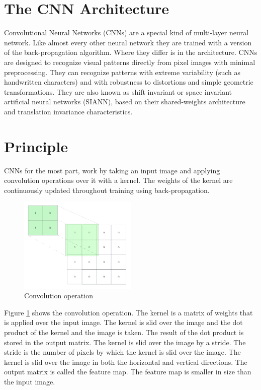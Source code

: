 \documentclass[wide]{adonis}
\begin{document}


\maketitle

\section{The CNN Architecture}

Convolutional Neural Networks (CNNs) are a special kind of multi-layer neural network. Like almost every other neural network they are trained with a version of the back-propagation algorithm. Where they differ is in the architecture. CNNs are designed to recognize visual patterns directly from pixel images with minimal preprocessing. They can recognize patterns with extreme variability (such as handwritten characters) and with robustness to distortions and simple geometric transformations. They are also known as shift invariant or space invariant artificial neural networks (SIANN), based on their shared-weights architecture and translation invariance characteristics.

\section{Principle}

CNNs for the most part, work by taking an input image and applying convolution operations over it with a kernel. The weights of the kernel are continuously updated throughout training using back-propagation.

\begin{figure}
	\centering
	\includegraphics[width=0.5\textwidth]{images/convolution.png}
	\caption{Convolution operation}
	\label{convolution}
\end{figure}

Figure \ref{convolution} shows the convolution operation. The kernel is a matrix of weights that is applied over the input image. The kernel is slid over the image and the dot product of the kernel and the image is taken. The result of the dot product is stored in the output matrix. The kernel is slid over the image by a stride. The stride is the number of pixels by which the kernel is slid over the image. The kernel is slid over the image in both the horizontal and vertical directions. The output matrix is called the feature map. The feature map is smaller in size than the input image.
\end{document}
